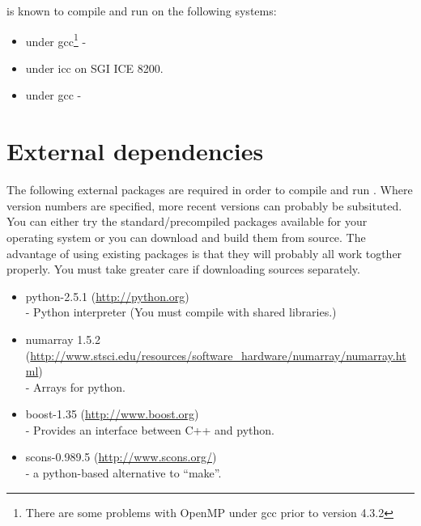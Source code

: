 
%
%
%



\esfinley is known to compile and run on the following systems:
\begin{itemize}
 \item \linux under gcc\footnote{There are some problems with OpenMP under gcc prior to version 4.3.2} - 
\item \linux under icc on SGI ICE 8200.
\item \macosx under gcc - 
\end{itemize}

\section{External dependencies}
The following external packages are required in order to compile and run \esfinley.
Where version numbers are specified, more recent versions can probably be subsituted.
You can either try the standard/precompiled packages available for your operating system or you can download and build them from source.
The advantage of using existing packages is that they will probably all work togther properly.
You must take greater care if downloading sources separately.

\begin{itemize}
 \item python-2.5.1 (\url{http://python.org}) \\
- Python  interpreter (You must compile with shared libraries.)
\item numarray 1.5.2 \\ (\url{http://www.stsci.edu/resources/software_hardware/numarray/numarray.html}) \\
- Arrays for python.
\item boost-1.35 (\url{http://www.boost.org}) \\
- Provides an interface between C++ and python.
\item scons-0.989.5 (\url{http://www.scons.org/}) \\
- a python-based alternative to ``make''.
\end{itemize}

